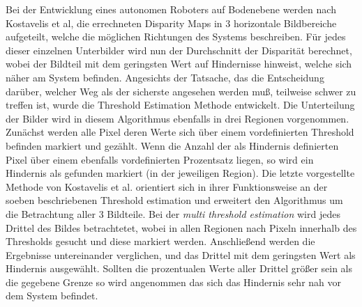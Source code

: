 \noindent
Bei der Entwicklung eines autonomen Roboters auf Bodenebene werden nach Kostavelis et al, \cite{kostavelis2010comparative} die errechneten Disparity Maps in 3 horizontale Bildbereiche aufgeteilt, welche die möglichen Richtungen des Systems beschreiben. Für jedes dieser einzelnen Unterbilder wird nun der Durchschnitt der Disparität berechnet, wobei der Bildteil mit dem geringsten Wert auf Hindernisse hinweist, welche sich näher am System befinden. Angesichts der Tatsache, das die Entscheidung darüber, welcher Weg als der sicherste angesehen werden muß, teilweise schwer zu treffen ist, wurde die Threshold Estimation Methode entwickelt.
Die Unterteilung der Bilder wird in diesem Algorithmus ebenfalls in drei Regionen vorgenommen. Zunächst werden alle Pixel deren Werte sich über einem vordefinierten Threshold befinden markiert und gezählt. 
Wenn die Anzahl der als Hindernis definierten Pixel über einem ebenfalls vordefinierten Prozentsatz liegen, so wird ein Hindernis als gefunden markiert (in der jeweiligen Region). Die letzte vorgestellte Methode von Kostavelis et al. orientiert sich in ihrer Funktionsweise an der soeben beschriebenen Threshold estimation und erweitert den Algorithmus um die Betrachtung aller 3 Bildteile.
Bei der \emph{multi threshold estimation} wird jedes Drittel des Bildes betrachtetet, wobei in allen Regionen nach Pixeln innerhalb des Thresholds gesucht und diese markiert werden. Anschließend werden die Ergebnisse untereinander verglichen, und das Drittel mit dem geringsten Wert als Hindernis ausgewählt. Sollten die prozentualen Werte aller Drittel größer sein als die gegebene Grenze so wird angenommen das sich das Hindernis sehr nah vor dem System befindet.\\

